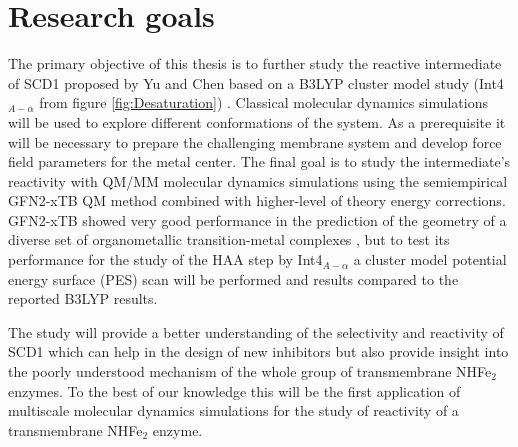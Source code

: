 \section{Research goals}
The primary objective of this thesis is to further study the reactive intermediate of SCD1 proposed by Yu and Chen based on a B3LYP cluster model study (Int4$_{A-\alpha}$ from figure \ref{fig:Desaturation}) \cite{Yu2019}. Classical molecular dynamics simulations will be used to explore different conformations of the system. As a prerequisite it will be necessary to prepare the challenging membrane system and develop force field parameters for the metal center. The final goal is to study the intermediate's reactivity with QM/MM molecular dynamics simulations using the semiempirical GFN2-xTB QM method \cite{Bannwarth2019,Bannwarth2020,Grimme2017} combined with higher-level of theory energy corrections. GFN2-xTB showed very good performance in the prediction of the geometry of a diverse set of organometallic transition-metal complexes \cite{Bursch2019}, but to test its performance for the study of the HAA step by Int4$_{A-\alpha}$ a cluster model potential energy surface (PES) scan will be performed and results compared to the reported B3LYP results.

The study will provide a better understanding of the selectivity and reactivity of SCD1 which can help in the design of new inhibitors but also provide insight into the poorly understood mechanism of the whole group of transmembrane NHFe$_2$ enzymes. To the best of our knowledge this will be the first application of multiscale molecular dynamics simulations for the study of reactivity of a transmembrane NHFe$_2$ enzyme. 


